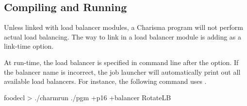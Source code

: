 \subsection{Compiling and Running}
Unless linked with load balancer modules, a Charisma program will not perform
actual load balancing. The way to link in a load balancer module is adding
 as a link-time option. 

At run-time, the load balancer is specified in command line after the
 option. If the balancer name is incorrect, the job launcher will
automatically print out all available load balancers. For instance, the following
command uses . 

\begin{SaveVerbatim}{foodecl}
    > ./charmrun ./pgm +p16 +balancer RotateLB
\end{SaveVerbatim}



